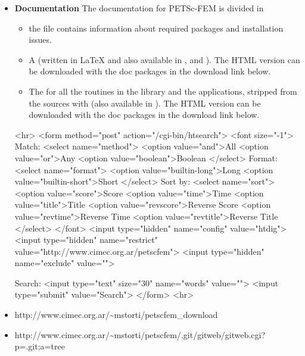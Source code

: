 \documentclass[11pt]{article}
\begin{document}
\begin{itemize}
\item \textbf{Documentation}
The documentation for PETSc-FEM is divided in 

\begin{itemize}
\item the  file contains
information about required packages and installation issues.

\item A 
(written in \LaTeX{} and also available in
, and
). The HTML version can be
downloaded with the doc packages in the download link below. 

\item The  for
all the routines in the library and the applications, stripped from
the sources with
(also available in ). The
HTML version can be downloaded with the doc packages in the download
link below.
\end{itemize}

\begin{rawhtml}
<hr>
<form method="post" action="/cgi-bin/htsearch">
<font size="-1">
Match: <select name="method">
<option value="and">All
<option value="or">Any
<option value="boolean">Boolean
</select>
Format: <select name="format">
<option value="builtin-long">Long
<option value="builtin-short">Short
</select>
Sort by: <select name="sort">
<option value="score">Score
<option value="time">Time
<option value="title">Title
<option value="revscore">Reverse Score
<option value="revtime">Reverse Time
<option value="revtitle">Reverse Title
</select>
</font>
<input type="hidden" name="config" value="htdig">
<input type="hidden" name="restrict" value="http://www.cimec.org.ar/petscfem">
<input type="hidden" name="exclude" value="">

Search:
<input type="text" size="30" name="words" value="">
<input type="submit" value="Search">
</form>
<hr>
\end{rawhtml}

\item {}
                {http://www.cimec.org.ar/\~{}mstorti/petscfem_download}
\item {}
  {http://www.cimec.org.ar/\~{}mstorti/petscfem/.git/gitweb/gitweb.cgi?p=.git;a=tree}

\end{itemize}
\end{document}
